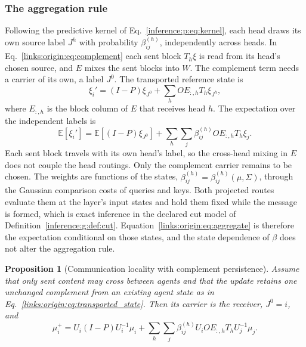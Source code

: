 \documentclass[11pt]{article}
\newtheorem{proposition}[theorem]{Proposition}
\theoremstyle{definition}
\theoremstyle{remark}
\begin{document}
\subsubsection{The aggregation rule}

Following the predictive kernel of Eq.~\eqref{inference:p:eq:kernel}, each head draws its own source label $J^h$ with probability $\beta_{ij}^{(h)}$, independently across heads. In Eq.~\eqref{links:origin:eq:complement} each sent block $T_h\xi$ is read from its head's chosen source, and $E$ mixes the sent blocks into $W$. The complement term needs a carrier of its own, a label $J^0$. The transported reference state is
\begin{equation}
\xi_i'=(I-P)\xi_{J^0}+\sum_hOE_{:,h}T_h\xi_{J^h},
\label{links:origin:eq:transported_state}
\end{equation}
where $E_{:,h}$ is the block column of $E$ that receives head $h$. The expectation over the independent labels is
\begin{equation}
\mathbb E[\xi_i']=\mathbb E[(I-P)\xi_{J^0}]+\sum_h\sum_j\beta_{ij}^{(h)}OE_{:,h}T_h\xi_j.
\label{links:origin:eq:aggregate}
\end{equation}
Each sent block travels with its own head's label, so the cross-head mixing in $E$ does not couple the head routings. Only the complement carrier remains to be chosen. The weights are functions of the states, $\beta_{ij}^{(h)}=\beta_{ij}^{(h)}(\mu,\Sigma)$, through the Gaussian comparison costs of queries and keys. Both projected routes evaluate them at the layer's input states and hold them fixed while the message is formed, which is exact inference in the declared cut model of Definition~\ref{inference:g:def:cut}. Equation~\eqref{links:origin:eq:aggregate} is therefore the expectation conditional on those states, and the state dependence of $\beta$ does not alter the aggregation rule.

\begin{proposition}[Communication locality with complement persistence]
\label{links:origin:prop:self_complement}
Assume that only sent content may cross between agents and that the update retains one unchanged complement from an existing agent state as in Eq.~\eqref{links:origin:eq:transported_state}. Then its carrier is the receiver, $J^0=i$, and
\begin{equation}
\mu_i^+=U_i(I-P)U_i^{-1}\mu_i+\sum_h\sum_j\beta_{ij}^{(h)}U_iOE_{:,h}T_hU_j^{-1}\mu_j.
\label{links:origin:eq:self_complement}
\end{equation}
\end{proposition}
\end{document}
